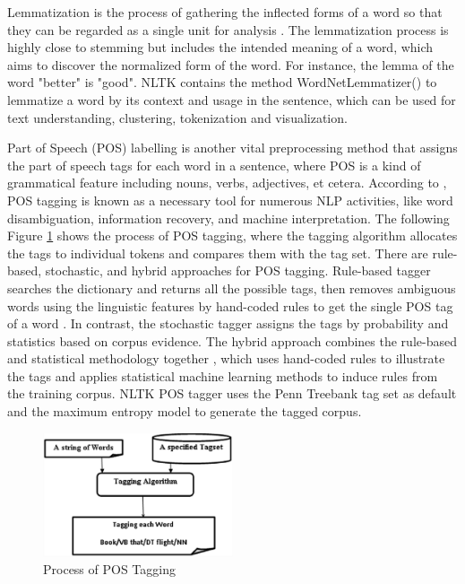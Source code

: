 Lemmatization is the process of gathering the inflected forms of a word so that they can be regarded as a single unit for analysis \cite{enwiki:1100992412}. The lemmatization process is highly close to stemming but includes the intended meaning of a word, which aims to discover the normalized form of the word. For instance, the lemma of the word "better" is "good". NLTK contains the method WordNetLemmatizer() to lemmatize a word by its context and usage in the sentence, which can be used for text understanding, clustering, tokenization and visualization. 

Part of Speech (POS) labelling is another vital preprocessing method that assigns the part of speech tags for each word in a sentence, where POS is a kind of grammatical feature including nouns, verbs, adjectives, et cetera. According to \cite{kumawat2015pos}, POS tagging is known as a necessary tool for numerous NLP activities, like word disambiguation, information recovery, and machine interpretation. The following Figure \ref{fig:7} shows the process of POS tagging, where the tagging algorithm allocates the tags to individual tokens and compares them with the tag set. There are rule-based, stochastic, and hybrid approaches for POS tagging. Rule-based tagger searches the dictionary and returns all the possible tags, then removes ambiguous words using the linguistic features by hand-coded rules to get the single POS tag of a word \cite{yogish2018review}. In contrast, the stochastic tagger assigns the tags by probability and statistics based on corpus evidence. The hybrid approach combines the rule-based and statistical methodology together \cite{rathod2015survey}, which uses hand-coded rules to illustrate the tags and applies statistical machine learning methods to induce rules from the training corpus. NLTK POS tagger uses the Penn Treebank tag set as default and the maximum entropy model to generate the tagged corpus.

 \begin{figure}[H]
    \centering
    \includegraphics[width=0.5\textwidth]{images/POS.png}
    \caption{Process of POS Tagging \cite{yogish2018review}}
    \label{fig:7}
\end{figure}



